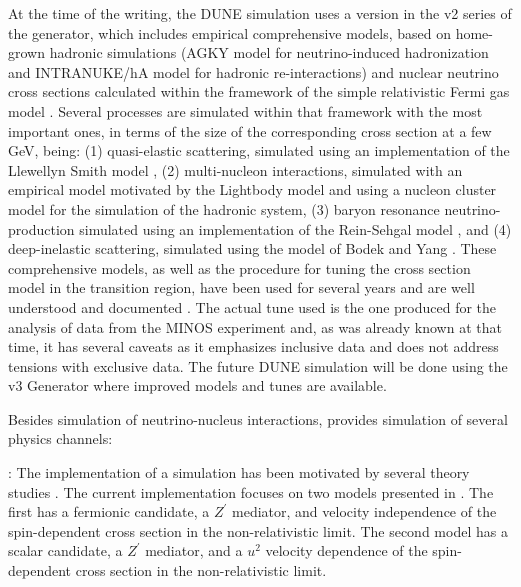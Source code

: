 At the time of the  writing, the DUNE simulation uses a version in the v2 series of the  generator, which includes empirical comprehensive models, based on home-grown hadronic simulations (AGKY model \cite{Yang:2009zx} for neutrino-induced hadronization and INTRANUKE/hA model \cite{Dytman:2015taa} for hadronic re-interactions) and nuclear neutrino cross sections calculated within the framework of the simple relativistic Fermi gas model \cite{Bodek:1981wr}. Several processes are simulated within that framework with the most important ones, in terms of the size of the corresponding cross section at a few GeV, being: (1) quasi-elastic scattering, simulated using an implementation of the Llewellyn Smith model \cite{LlewellynSmith:1971uhs}, (2) multi-nucleon interactions, simulated with an empirical model motivated by the Lightbody model \cite{Lightbody:1988gcu} and using a nucleon cluster model for the simulation of the hadronic system, (3) baryon resonance neutrino-production simulated using an implementation of the Rein-Sehgal model \cite{Rein:1980wg}, and (4) deep-inelastic scattering, simulated using the model of Bodek and Yang \cite{Bodek:2002ps}.  These comprehensive models, as well as the  procedure for tuning the cross section model in the transition region, have been used for several years and are well understood and documented \cite{Andreopoulos:2009rq}. The actual tune used is the one produced for the analysis of data from the MINOS experiment and, as was already known at that time, it has several caveats as it emphasizes inclusive data and does not address tensions with exclusive data. The future DUNE simulation will be done using the v3  Generator where improved models and tunes are available. 



Besides simulation of neutrino-nucleus interactions,  provides simulation of several  physics channels:

\textit{}: The implementation of a   simulation has been motivated by several theory studies \cite{Agashe:2014yua, 
Berger:2014sqa, Kong:2014mia, Cherry:2015oca, Kopp:2015bfa, Necib:2016aez, Alhazmi:2016qcs, Kim:2016zjx}. The current implementation focuses on two models presented in  \cite{Berger:2014sqa}. The first has a fermionic  candidate, a $Z^\prime$ mediator, and velocity independence of the spin-dependent cross section in the non-relativistic limit. The second model has a scalar  candidate, a $Z^\prime$ mediator, and a $u^2$ velocity dependence of the spin-dependent cross section in the non-relativistic limit.

